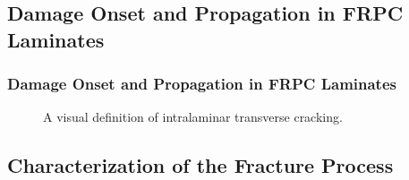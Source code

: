 \documentclass[first,firstsupp,lastsupp,handout,last,hyperref,table]{ETHclass}
\begin{document}
\subsection[Damage in FRPC]{Damage Onset and Propagation in FRPC Laminates}

\begin{frame}
\frametitle{\small Damage Onset and Propagation in FRPC Laminates}
\vspace{-0.75cm}
\centering
\captionsetup[subfigure]{labelfont=footnotesize}
\begin{figure}[!h]
\centering
{}\quad
{}
 \caption{A visual definition of intralaminar transverse cracking.}
  \label{fig:intralaminar-cracks}
\end{figure}
\end{frame}

\subsection[Characterization of the Fracture Process]{Characterization of the Fracture Process}
\end{document}
